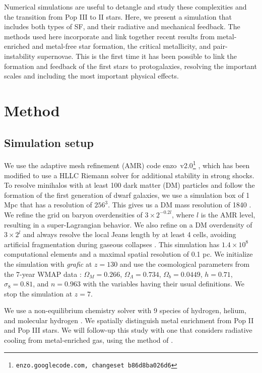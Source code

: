\documentclass{PoS}
\begin{document}
Numerical simulations are useful to detangle and study these
complexities and the transition from Pop III to II stars.  Here, we
present a simulation that includes both types of SF, and their
radiative and mechanical feedback.  The methods used here incorporate
and link together recent results from metal-enriched and metal-free
star formation, the critical metallicity, and pair-instability
supernovae.  This is the first time it has been possible to link the
formation and feedback of the first stars to protogalaxies, resolving
the important scales and including the most important physical
effects.

\section{Method}
\label{sec:setup}

\subsection{Simulation setup}

We use the adaptive mesh refinement (AMR) code
enzo~v2.0\footnote{\texttt{enzo.googlecode.com, changeset
    b86d8ba026d6}} \citep{OShea2004}, which has been modified to use a
HLLC Riemann solver \citep{Toro94_HLLC} for additional stability in
strong shocks.  To resolve minihalos with at least 100 dark matter
(DM) particles and follow the formation of the first generation of
dwarf galaxies, we use a simulation box of 1 Mpc that has a resolution
of $256^3$.  This gives us a DM mass resolution of 1840 \Ms.  We
refine the grid on baryon overdensities of $3 \times 2^{-0.2l}$, where
$l$ is the AMR level, resulting in a super-Lagrangian behavior.  We
also refine on a DM overdensity of $3 \times 2^l$ and always resolve
the local Jeans length by at least 4 cells, avoiding artificial
fragmentation during gaseous collapses \citep{Truelove97}.  This
simulation has $1.4 \times 10^8$ computational elements and a maximal
spatial resolution of 0.1 pc.  We initialize the simulation with
\textsl{grafic} \citep{Bertschinger01} at $z = 130$ and use the
cosmological parameters from the 7-year WMAP data \citep{WMAP7}:
$\Omega_M = 0.266$, $\Omega_\Lambda = 0.734$, $\Omega_b = 0.0449$, $h
= 0.71$, $\sigma_8 = 0.81$, and $n = 0.963$ with the variables having
their usual definitions.  We stop the simulation at $z=7$.

We use a non-equilibrium chemistry solver with 9 species of hydrogen,
helium, and molecular hydrogen \citep{Abel97}.  We spatially
distinguish metal enrichment from Pop II and Pop III stars.  We will
follow-up this study with one that considers radiative cooling from
metal-enriched gas, using the method of \citet{2008MNRAS.385.1443S}.
\end{document}
